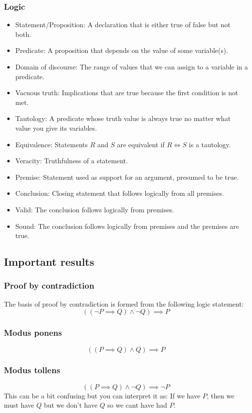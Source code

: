 \documentclass[12pt]{article}
\begin{document}
\subsubsection*{Logic}
\begin{itemize}
    \item Statement/Proposition: A declaration that is either true of false but not both.
    \item Predicate: A proposition that depends on the value of some variable(s).
    \item Domain of discourse: The range of values that we can assign to a variable in a predicate.
    \item Vacuous truth: Implications that are true because the first condition is not met.
    \item Tautology: A predicate whose truth value is always true no matter what value you give its variables.  
    \item Equivalence: Statements \(R\) and \(S\) are equivalent if \(R\iff S\) is a tautology.
    \item Veracity: Truthfulness of a statement.
    \item Premise: Statement used as support for an argument, presumed to be true.
    \item Conclusion: Closing statement that follows logically from all premises.
    \item Valid: The conclusion follows logically from premises.
    \item Sound: The conclusion follows logically from premises and the premises are true.
\end{itemize}
\subsection*{Important results}
\subsubsection*{Proof by contradiction}
The basis of proof by contradiction is formed from the following logic statement:
\[((\lnot P\implies Q)\land \lnot Q)\implies P\]
\subsubsection*{Modus ponens}
\[((P\implies Q)\land Q)\implies P\]
\subsubsection*{Modus tollens}
\[((P\implies Q)\land \lnot Q)\implies \lnot P\]
This can be a bit confusing but you can interpret it as: If we have \(P\), then we must have \(Q\) but we don't have \(Q\) so we cant have had \(P\).
\end{document}
